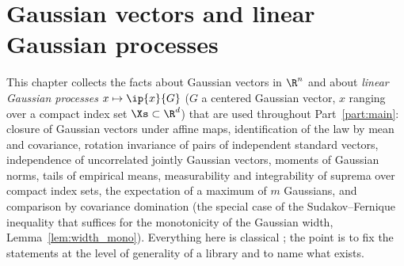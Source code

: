 \chapter{Gaussian vectors and linear Gaussian processes}
\label{chap:pre_gaussian}

This chapter collects the facts about Gaussian vectors in $\R^n$ and about \emph{linear
Gaussian processes} $x \mapsto \ip{x}{G}$ ($G$ a centered Gaussian vector, $x$ ranging over
a compact index set $\Xs \subset \R^d$) that are used throughout Part~\ref{part:main}: closure
of Gaussian vectors under affine maps, identification of the law by mean and covariance,
rotation invariance of pairs of independent standard vectors, independence of uncorrelated
jointly Gaussian vectors, moments of Gaussian norms, tails of empirical means, measurability
and integrability of suprema over compact index sets, the expectation of a maximum of $m$
Gaussians, and comparison by covariance domination (the special case of the
Sudakov--Fernique inequality that suffices for the monotonicity of the Gaussian width,
Lemma~\ref{lem:width_mono}). Everything here is classical
\cite{vershynin2018high, boucheron2013concentration}; the point is to fix the statements at
the level of generality of a library and to name what exists.

